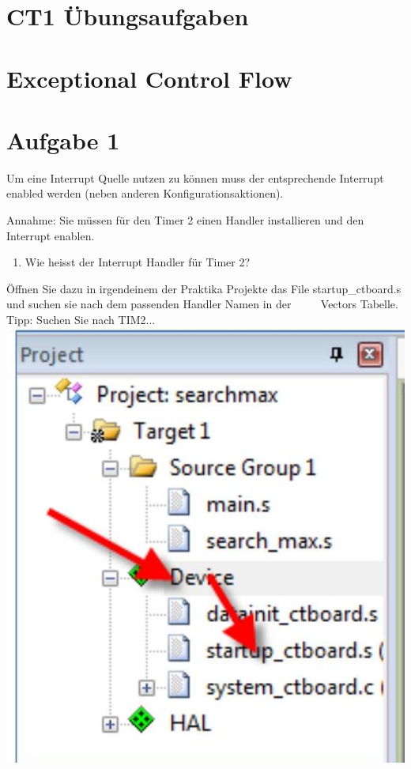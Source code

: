 \documentclass[10pt]{article}
\begin{document}
\section*{CT1 Übungsaufgaben}
\section*{Exceptional Control Flow}
\section*{Aufgabe 1}
Um eine Interrupt Quelle nutzen zu können muss der entsprechende Interrupt enabled werden (neben anderen Konfigurationsaktionen).

Annahme: Sie müssen für den Timer 2 einen Handler installieren und den Interrupt enablen.

\begin{enumerate}
  \item Wie heisst der Interrupt Handler für Timer 2?
\end{enumerate}

Öffnen Sie dazu in irgendeinem der Praktika Projekte das File startup\_ctboard.s und suchen sie nach dem passenden Handler Namen in der $\qquad$ Vectors Tabelle.\\
Tipp: Suchen Sie nach TIM2...\\
\includegraphics[width=\linewidth]{images/2025_01_02_1e89fec346403e1ae751g-1}
\end{document}
